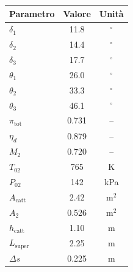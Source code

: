 \begin{figure}[H]
    \centering

    \begin{minipage}[c]{0.55\textwidth}
        \centering
        
    \end{minipage}%
    \hfill
    \begin{minipage}[c]{0.44\textwidth}
        \centering


               
        \scriptsize
        \renewcommand{\arraystretch}{1}
        \setlength{\tabcolsep}{3.5pt}

 
        \fontsize{11pt}{11pt}\selectfont
        \begin{tabular}{lcc}
            \toprule
            \textbf{Parametro} & \textbf{Valore} & \textbf{Unità} \\
            \midrule
            $\delta_1$ & 11.8 & $^\circ$ \\
            $\delta_2$ & 14.4 & $^\circ$ \\
            $\delta_3$ & 17.7 & $^\circ$ \\
            $\theta_1$ & 26.0 & $^\circ$ \\
            $\theta_2$ & 33.3 & $^\circ$ \\
            $\theta_3$ & 46.1 & $^\circ$ \\
            \midrule
            $\pi_{\mathrm{tot}}$ & 0.731 & -- \\
            $\eta_d$             & 0.879 & -- \\
            $M_2$                & 0.720 & -- \\
            $T_{02}$             & 765 & K \\
            $P_{02}$             & 142 & kPa \\
            \midrule
            $A_{\mathrm{catt}}$  & 2.42 & m$^2$ \\
            $A_2$                & 0.526 & m$^2$ \\
            $h_{\mathrm{catt}}$  & 1.10 & m \\
            $L_{\mathrm{super}}$ & 2.25 & m \\
            $\Delta s$           & 0.225 & m \\
            \bottomrule
        \end{tabular}

 
    \label{tab:miei_parametri}

        \label{tab:miei_parametri}
    \end{minipage}

\end{figure}

























